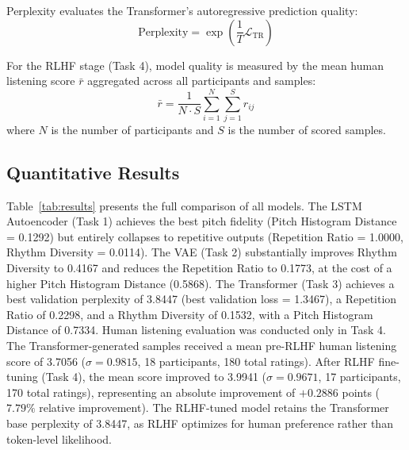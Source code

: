 \documentclass[conference]{IEEEtran}
\begin{document}
Perplexity evaluates the Transformer's autoregressive prediction quality:
\begin{equation}
\text{Perplexity} = \exp\!\left(\frac{1}{T} \mathcal{L}_{\text{TR}}\right)
\end{equation}

For the RLHF stage (Task 4), model quality is measured by the mean human
listening score $\bar{r}$ aggregated across all participants and samples:
\begin{equation}
\bar{r} = \frac{1}{N \cdot S} \sum_{i=1}^{N} \sum_{j=1}^{S} r_{ij}
\end{equation}
where $N$ is the number of participants and $S$ is the number of scored samples.

\subsection{Quantitative Results}

Table~\ref{tab:results} presents the full comparison of all models. The LSTM
Autoencoder (Task 1) achieves the best pitch fidelity (Pitch Histogram Distance
= 0.1292) but entirely collapses to repetitive outputs (Repetition Ratio =
1.0000, Rhythm Diversity = 0.0114). The VAE (Task 2) substantially improves
Rhythm Diversity to 0.4167 and reduces the Repetition Ratio to 0.1773, at the
cost of a higher Pitch Histogram Distance (0.5868). The Transformer (Task 3)
achieves a best validation perplexity of 3.8447 (best validation loss =
1.3467), a Repetition Ratio of 0.2298, and a Rhythm Diversity of 0.1532, with
a Pitch Histogram Distance of 0.7334. Human listening evaluation was conducted
only in Task 4. The Transformer-generated samples received a mean pre-RLHF
human listening score of 3.7056 ($\sigma = 0.9815$, 18 participants, 180 total
ratings). After RLHF fine-tuning (Task 4), the mean score improved to 3.9941
($\sigma = 0.9671$, 17 participants, 170 total ratings), representing an
absolute improvement of $+0.2886$ points ($7.79\%$ relative improvement). The
RLHF-tuned model retains the Transformer base perplexity of 3.8447, as RLHF
optimizes for human preference rather than token-level likelihood.

\end{document}

